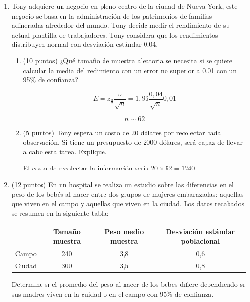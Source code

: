 \documentclass[10pt,a4paper]{article}
\begin{document}
\begin{enumerate}




    \item Tony  adquiere un negocio en pleno centro de la ciudad de Nueva York, este negocio se basa en
la administraci\'on de los patrimonios de familias adineradas alrededor del mundo.
Tony decide medir el rendimiento de su actual plantilla de trabajadores. Tony considera que los rendimientos distribuyen normal con desviaci\'on est\'andar 0.04. 
\begin{enumerate}
    \item (10 puntos) ¿Qu\'e tamaño de muestra aleatoria se necesita si se quiere calcular la media del redimiento con un error no superior a 0.01 con un 95\% de confianza?

{\color{red} $$E=z_{\frac{\alpha}{2}}\frac{\sigma}{\sqrt{n}}=1,96 \frac{0,04}{\sqrt{n}}0,01$$

    $$n\sim 62$$}
    \item (5 puntos)  Tony espera un costo de 20 d\'olares por recolectar cada observaci\'on. Si tiene un presupuesto de
2000 d\'olares, ser\'a capaz de llevar a cabo esta tarea. Explique.

{\color{red} El costo de recolectar la información sería $20\times 62= 1240$}
\end{enumerate}

\item (12 puntos) En un hospital se realiza un estudio sobre las diferencias  en el peso de los bebés al nacer entre dos grupos de mujeres embarazadas: aquellas que viven en el campo y aquellas que viven en la ciudad. Los datos recabados  se resumen en la siguiente tabla:

\begin{center}
    \begin{tabular}{| l| c | c| c|}
\hline
& Tamaño muestra& Peso medio muestra & Desviación estándar poblacional \\ \hline
Campo &240 &3,8&0,6 \\
Ciudad & 300& 3,5& 0,8\\ \hline
\end{tabular}
\end{center}

Determine si el promedio del peso al nacer de los bebes difiere dependiendo si sus madres  viven en la cuidad o en el campo con 95\% de confianza.


\end{enumerate}
\end{document}
